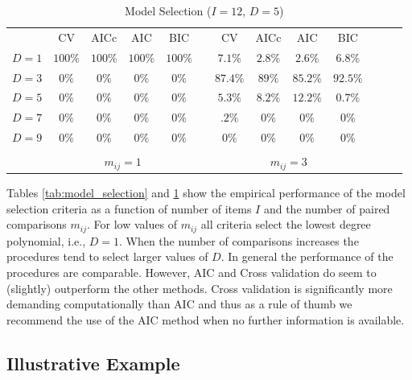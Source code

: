 \documentclass[twoside,11pt]{article}
\begin{document}
\begin{table}[]
\centering
\begin{tabular}{ccccccccccccc}
        & CV & AICc    & AIC   & BIC      & &CV & AICc   & AIC      & BIC   \\
$D = 1$ &       $100\%$    & $100\%$ & $100\%$ & $100\%$& &     $7.1\%$      & $2.8\%$  & $2.6\%$&$6.8\%$ \\
$D = 3$ &       $0\%$      & $0\%$   & $0\%$  & $0\%$   & &     $87.4\%$     & $89\%$ & $85.2\%$ &$92.5\%$\\
$D = 5$ &       $0\%$      & $0\%$   & $0\%$   & $0\%$  & &     $5.3\%$      & $8.2\%$ & $12.2\%$& $0.7\%$ \\
$D = 7$ &       $0\%$      & $0\%$   & $0\%$   & $0\%$  & &     $.2\%$       & $0\%$ & $0\%$ & $0\%$ \\
$D = 9$ &       $0\%$      & $0\%$   & $0\%$  & $0\%$   & &     $0\%$        & $0\%$ & $0\%$  & $0\%$ \\  \cmidrule{2-5}  \cmidrule{7-10}\\
& \multicolumn{4}{c}{$m_{ij}= 1$}  & & \multicolumn{4}{c}{$m_{ij}= 3$}
\end{tabular}
\caption{Model Selection ($I = 12$, $D=5$)}
\label{tab:model_selection2}
\end{table}
Tables \ref{tab:model_selection} and \ref{tab:model_selection2}  show the empirical performance of the model selection criteria as a function of number of items $I$ and the number of paired comparisons $m_{ij}$. For low values of $m_{ij}$ all criteria select the lowest degree polynomial, i.e., $D=1$. When the number of comparisons increases the procedures tend to select larger values of $D$. In general the performance of the procedures are comparable. However, AIC and Cross validation do seem to (slightly) outperform the other methods. Cross validation is significantly more demanding computationally than AIC and thus as a rule of thumb we recommend the use of the AIC method when no further information is available.

\subsection{Illustrative Example}
\end{document}
